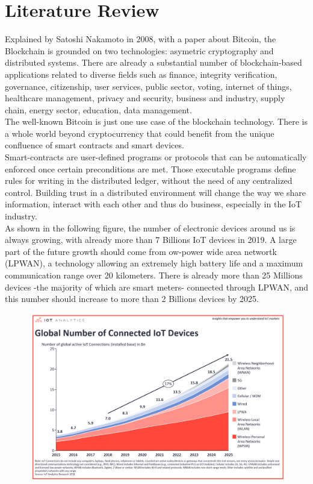 \documentclass[11pt]{article}
\begin{document}
\section{Literature Review}
Explained by Satoshi Nakamoto in 2008, with a paper about Bitcoin, the Blockchain is grounded on two technologies: asymetric cryptography and distributed systems. There are already a substantial number of blockchain-based applications related to diverse fields such as finance, integrity verification, governance, citizenship, user services, public sector, voting, internet of things, healthcare management, privacy and security, business and industry, supply chain, energy sector, education, data management.\cite{1} \\
The well-known Bitcoin is just one use case of the blockchain technology. There is a whole world beyond cryptocurrency that could benefit from the unique confluence of smart contracts and smart devices.\\
Smart-contracts are user-defined programs or protocols that can be automatically enforced once certain preconditions are met. Those executable programs define rules for writing in the distributed ledger, without the need of any centralized control. Building trust in a distributed environment will change the way we share information, interact with each other and thus do business, especially in the IoT industry.\cite{2}\\
As shown in the following figure\cite{3}, the number of electronic devices around us is always growing, with already more than 7 Billions IoT devices in 2019. A large part of the future growth should come from ow-power wide area networtk (LPWAN), a technology allowing an extremely high battery life and a maximum communication range over 20 kilometers. There is already more than 25 Millions devices -the majority of which are smart meters- connected through LPWAN, and this number should increase to more than 2 Billions devices by 2025.\\
\begin{figure}[h]
	\centering
	\includegraphics[width=0.8\linewidth]{stateofIoT2018.png}
\end{figure}\\
\end{document}
